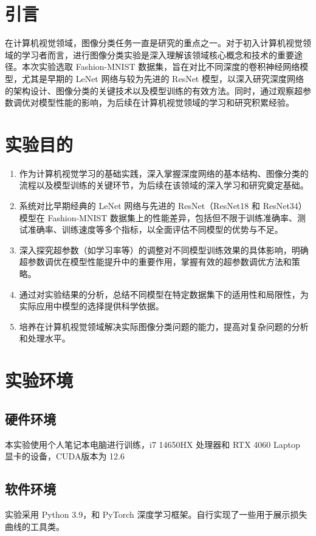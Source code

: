 \documentclass[UTF8]{ctexart}
\begin{document}
\newpage

\tableofcontents  %


\newpage
\section{引言}
在计算机视觉领域，图像分类任务一直是研究的重点之一。对于初入计算机视觉领域的学习者而言，进行图像分类实验是深入理解该领域核心概念和技术的重要途径。本次实验选取 Fashion-MNIST 数据集，旨在对比不同深度的卷积神经网络模型，尤其是早期的 LeNet 网络与较为先进的 ResNet 模型，以深入研究深度网络的架构设计、图像分类的关键技术以及模型训练的有效方法。同时，通过观察超参数调优对模型性能的影响，为后续在计算机视觉领域的学习和研究积累经验。

\section{实验目的}
\begin{enumerate}
\item 作为计算机视觉学习的基础实践，深入掌握深度网络的基本结构、图像分类的流程以及模型训练的关键环节，为后续在该领域的深入学习和研究奠定基础。
\item 系统对比早期经典的 LeNet 网络与先进的 ResNet（ResNet18 和 ResNet34）模型在 Fashion-MNIST 数据集上的性能差异，包括但不限于训练准确率、测试准确率、训练速度等多个指标，以全面评估不同模型的优势与不足。
\item 深入探究超参数（如学习率等）的调整对不同模型训练效果的具体影响，明确超参数调优在模型性能提升中的重要作用，掌握有效的超参数调优方法和策略。
\item 通过对实验结果的分析，总结不同模型在特定数据集下的适用性和局限性，为实际应用中模型的选择提供科学依据。
\item 培养在计算机视觉领域解决实际图像分类问题的能力，提高对复杂问题的分析和处理水平。
\end{enumerate}

\section{实验环境}
\subsection{硬件环境}
本实验使用个人笔记本电脑进行训练，i7 14650HX 处理器和 RTX 4060 Laptop 显卡的设备，CUDA版本为 12.6

\subsection{软件环境}
实验采用 Python 3.9，和 PyTorch 深度学习框架。自行实现了一些用于展示损失曲线的工具类。
\end{document}
